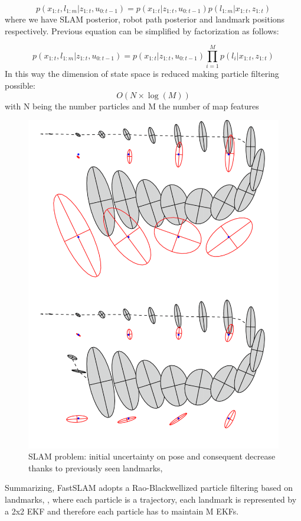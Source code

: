 \begin{equation}
    p(x_{1:t},l_{1:m} | z_{1:t},u_{0:t-1}) = p(x_{1:t} | z_{1:t},u_{0:t-1})p(l_{1:m} | x_{1:t},z_{1:t}) 
\end{equation}
where we have SLAM posterior, robot path posterior and landmark positions respectively. Previous equation can be simplified by factorization as follows:

\begin{equation}
     p(x_{1:t},l_{1:m} | z_{1:t},u_{0:t-1}) = p(x_{1:t} | z_{1:t},u_{0:t-1})\prod_{i=1}^{M}p(l_{i} | x_{1:t},z_{1:t})
\end{equation}
In this way the dimension of state space is reduced making particle filtering possible:
\begin{equation}
    O(N\times\log(M))
\end{equation}
with N being the number particles and M the number of map features
\begin{figure}[H]
    \centering
    \includegraphics[scale=0.35]{Images/Chapter 4/slam_uncertainty.png}
    \caption{SLAM problem: initial uncertainty on pose and consequent decrease thanks to previously seen landmarks, \citet{thrun2004}}
    \label{fig:slam_uncertainty}
\end{figure}
Summarizing, FastSLAM adopts a Rao-Blackwellized particle filtering based on landmarks, \citet{montemerlo2002}, where each particle is a trajectory, each landmark is represented by a 2x2 EKF and therefore each particle has to maintain M EKFs.



